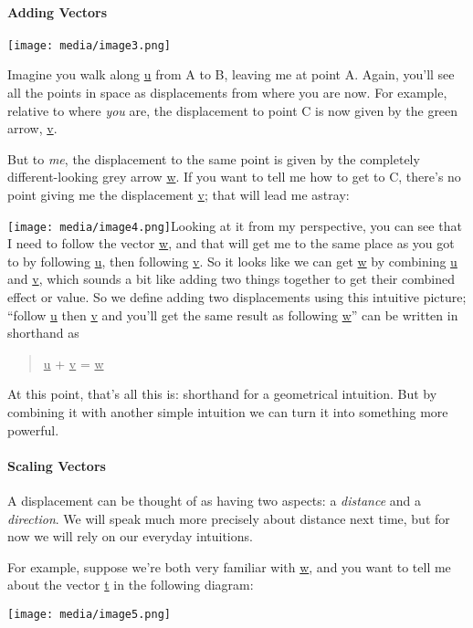 \documentclass[oneside,english]{amsbook}
\numberwithin{section}{chapter}
\theoremstyle{plain}
\theoremstyle{definition}
\begin{document}
\paragraph{Adding Vectors}

\texttt{[image: media/image3.png]}

Imagine you walk along \ul{u} from A to B, leaving me at point A. Again,
you'll see all the points in space as displacements from where you are
now. For example, relative to where \emph{you} are, the displacement to
point C is now given by the green arrow, \ul{v}.

But to \emph{me}, the displacement to the same point is given by the
completely different-looking grey arrow \ul{w}. If you want to tell me
how to get to C, there's no point giving me the displacement \ul{v};
that will lead me astray:

\texttt{[image: media/image4.png]}Looking
at it from my perspective, you can see that I need to follow the vector
\ul{w}, and that will get me to the same place as you got to by
following \ul{u}, then following \ul{v}. So it looks like we can get
\ul{w} by combining \ul{u} and \ul{v}, which sounds a bit like adding
two things together to get their combined effect or value. So we define
adding two displacements using this intuitive picture; ``follow \ul{u}
then \ul{v} and you'll get the same result as following \ul{w}'' can be
written in shorthand as

\begin{quote}
	\ul{u} + \ul{v} = \ul{w}
\end{quote}

At this point, that's all this is: shorthand for a geometrical
intuition. But by combining it with another simple intuition we can turn
it into something more powerful.

\paragraph{Scaling Vectors}

A displacement can be thought of as having two aspects: a
\emph{distance} and a \emph{direction}. We will speak much more
precisely about distance next time, but for now we will rely on our
everyday intuitions.

For example, suppose we're both very familiar with \ul{w}, and you want
to tell me about the vector \ul{t} in the following diagram:

\texttt{[image: media/image5.png]}
\end{document}
